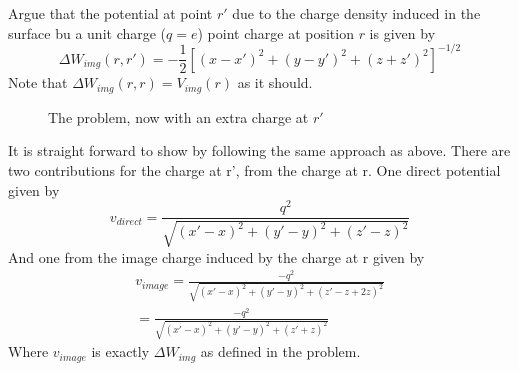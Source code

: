 \begin{exercise}
Argue that the potential at point $r'$ due to the charge density induced in the surface bu a unit charge ($q=e$) point charge at position $r$ is given by
\begin{equation}
    \Delta W_{img}(r,r') = -\frac{1}{2} [(x-x')^2 + (y-y')^2 + (z+z')^2]^{-1/2}
\end{equation}
Note that $\Delta W_{img}(r,r) = V_{img}(r)$ as it should.
\end{exercise}
\begin{solution}

\begin{figure}[!ht]
    \centering
    \caption{The problem, now with an extra charge at $r'$}
    \label{fig:ImageCharge2}
\end{figure}
It is straight forward to show by following the same approach as above. There are two contributions for the charge at r', from the charge at r. One direct potential given by
\begin{equation}
    v_{direct} = \frac{q^2}{\sqrt{(x'-x)^2 + (y'-y)^2 + (z'-z)^2}}
\end{equation}
And one from the image charge induced by the charge at r given by
\begin{equation}
\begin{split}\label{eq:806}
    v_{image} = \frac{-q^2}{\sqrt{(x'-x)^2 + (y'-y)^2 + (z'-z +2z)^2}} \\ = \frac{-q^2}{\sqrt{(x'-x)^2 + (y'-y)^2 + (z'+z)^2}}
    \end{split}
\end{equation}
Where $v_{image}$ is exactly $\Delta W_{img}$ as defined in the problem. 
\end{solution}

